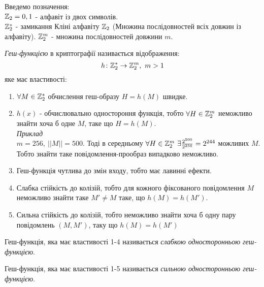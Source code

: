 Введемо позначення:\\
\( \mathbb Z_{2} = {0, 1} \) - алфавіт із двох символів.\\
\( \mathbb Z_{2}^{*} \) - замикання Кліні алфавіту \( \mathbb Z_{2} \) (Множина послідовностей всіх довжин із алфавіту). 
\( \mathbb Z_{2}^{m} \) - множина послідовностей довжини \( m \).
\begin{mydef}
\textit{Геш-функцією} в криптографії називається відображення:\\
\[ h \colon \mathbb Z_{2}^{*} \rightarrow \mathbb Z_{2}^{m},\ m>1\]
яке має властивості:
\begin{enumerate}
\item \( \forall M \in \mathbb Z_{2}^{*} \) обчислення геш-образу \( H = h(M) \) швидке.
\item \( h(x) \) - обчислювально одностороння функція, тобто \( \forall H \in \mathbb Z_{2}^{m} \) неможливо знайти хоча б одне \( M \), таке що \( H = h(M) \).\\
\textit{Приклад}\\
\( m=256,\ ||M||=500 \). Тоді в середньому \( \forall H \in \mathbb Z_{2}^{m}\ \exists \frac{2^{500}}{2^{256}} = 2^{244} \) можливих \( M \). Тобто знайти таке повідомлення-прообраз випадково неможливо.
\item Геш-функція чутлива до змін входу, тобто має лавинні ефекти.
\item Слабка стійкість до колізій, тобто для кожного фіксованого повідомлення \( M \) неможливо знайти таке \( M' \neq M \) таке, що \( h(M) = h(M') \).
\item Сильна стійкість до колізій, тобто неможливо знайти хоча б одну пару повідомлень \( (M, M') \), таку що \( h(M) = h(M') \)
\end{enumerate}
\end{mydef}

\begin{mydef}
Геш-функція, яка має властивості 1-4 називається \textit{слабкою односторонньою геш-функцією}.
\end{mydef}

\begin{mydef}
Геш-функція, яка має властивості 1-5 називається \textit{сильною односторонньою геш-функцією}.
\end{mydef}

